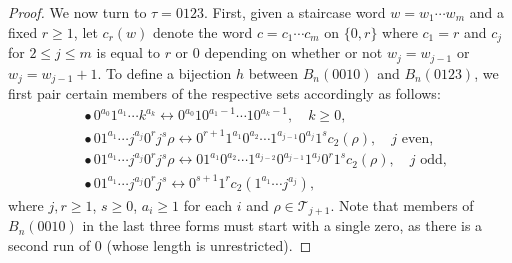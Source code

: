 \documentclass{article}
\theoremstyle{remark}
\theoremstyle{plain}
\begin{document}
\begin{proof}
We now turn to $\tau=0123$.  First, given a staircase word $w=w_1\cdots w_m$ and a fixed $r\geq1$, let $c_r(w)$ denote the word $c=c_1\cdots c_m$ on $\{0,r\}$ where $c_1=r$ and $c_j$ for $2 \leq j \leq m$ is equal to $r$ or $0$ depending on whether or not $w_j=w_{j-1}$ or $w_j=w_{j-1}+1$. To define a bijection $h$ between $B_n(0010)$ and $B_n(0123)$, we first pair certain members of the respective sets accordingly as follows:
\begin{align*}
&\bullet\, 0^{a_0}1^{a_1}\cdots k^{a_k} \longleftrightarrow 0^{a_0}10^{a_1-1}\cdots10^{a_{k}-1}, \quad k \geq0,\\
&\bullet\, 01^{a_1}\cdots j^{a_j}0^rj^s\rho \longleftrightarrow 0^{r+1}1^{a_1}0^{a_2}\cdots1^{a_{j-1}}0^{a_j}1^sc_2(\rho), \quad j \text{ even,}\\
&\bullet\, 01^{a_1}\cdots j^{a_j}0^rj^s\rho \longleftrightarrow 01^{a_1}0^{a_2}\cdots1^{a_{j-2}}0^{a_{j-1}}1^{a_j}0^r1^sc_2(\rho), \quad j \text{ odd,}\\
&\bullet\, 01^{a_1}\cdots j^{a_j}0^rj^s \longleftrightarrow 0^{s+1}1^rc_2(1^{a_1}\cdots j^{a_j}),
\end{align*}
where $j,r\geq 1$, $s \geq0$, $a_i\geq1$ for each $i$ and $\rho \in \mathcal{T}_{j+1}$.  Note that members of $B_n(0010)$ in the last three forms must start with a single zero, as there is a second run of $0$ (whose length is unrestricted).


\end{proof}
\end{document}
